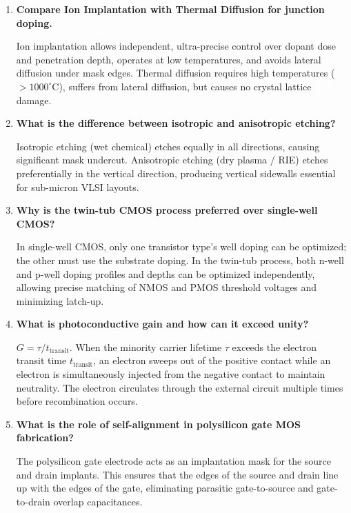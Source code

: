 \documentclass[12pt,a4paper]{article}
\newcommand{\Q}[1]{\textbf{#1}\par\noindent\ignorespaces}
\begin{document}
\begin{tcolorbox}[exambox, title={\textbf{Frequently Asked / Viva Questions}}]
\begin{enumerate}[topsep=0pt, label=\textbf{Q\arabic*.}, itemsep=5pt]
  \item \Q{Compare Ion Implantation with Thermal Diffusion for junction doping.}
    Ion implantation allows independent, ultra-precise control over dopant dose and penetration depth, operates at low temperatures, and avoids lateral diffusion under mask edges. Thermal diffusion requires high temperatures ($>1000^\circ\text{C}$), suffers from lateral diffusion, but causes no crystal lattice damage.
  \item \Q{What is the difference between isotropic and anisotropic etching?}
    Isotropic etching (wet chemical) etches equally in all directions, causing significant mask undercut. Anisotropic etching (dry plasma / RIE) etches preferentially in the vertical direction, producing vertical sidewalls essential for sub-micron VLSI layouts.
  \item \Q{Why is the twin-tub CMOS process preferred over single-well CMOS?}
    In single-well CMOS, only one transistor type's well doping can be optimized; the other must use the substrate doping. In the twin-tub process, both n-well and p-well doping profiles and depths can be optimized independently, allowing precise matching of NMOS and PMOS threshold voltages and minimizing latch-up.
  \item \Q{What is photoconductive gain and how can it exceed unity?}
    $G = \tau / t_{\text{transit}}$. When the minority carrier lifetime $\tau$ exceeds the electron transit time $t_{\text{transit}}$, an electron sweeps out of the positive contact while an electron is simultaneously injected from the negative contact to maintain neutrality. The electron circulates through the external circuit multiple times before recombination occurs.
  \item \Q{What is the role of self-alignment in polysilicon gate MOS fabrication?}
    The polysilicon gate electrode acts as an implantation mask for the source and drain implants. This ensures that the edges of the source and drain line up with the edges of the gate, eliminating parasitic gate-to-source and gate-to-drain overlap capacitances.
\end{enumerate}
\end{tcolorbox}
\end{document}
